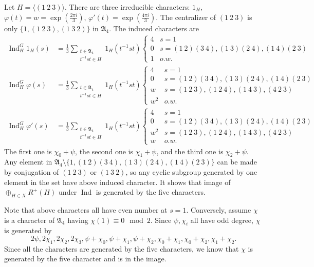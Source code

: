 \documentclass[a4paper, 12pt]{article}
\theoremstyle{Mydefinition}
\theoremstyle{Mytheorem}
\DeclareMathOperator{\Ind}{Ind}
\begin{document}
Let $H = \langle (1~2~3)\rangle$. There are three irreducible characters: $1_H$, $\varphi(t) = w= \exp\left(\frac{2\pi i}{3}\right)$, $\varphi'(t)=\exp\left(\frac{4\pi i}{3}\right)$. The centralizer of $(1~2~3)$ is only $\{1, (1~2~3), (1~3~2)\}$ in $\mathfrak{A}_4$. The induced characters are
\begin{equation}
\begin{split}
    \Ind_H^G 1_H(s) &=\frac{1}{3}\sum_{\substack{t\in \mathfrak{A}_4\\t^{-1}st\in H}} 1_H(t^{-1}st)\begin{cases}
    4 & s=1\\
    0 & s=(1~2)(3~4), (1~3)(2~4), (1~4)(2~3)\\
    1 & o.w.
    \end{cases}\\
    \Ind_H^G \varphi(s) &=\frac{1}{3}\sum_{\substack{t\in \mathfrak{A}_4\\t^{-1}st\in H}} 1_H(t^{-1}st)\begin{cases}
    4 & s=1\\
    0 & s=(1~2)(3~4), (1~3)(2~4), (1~4)(2~3)\\
    w & s=(1~2~3),(1~2~4),(1~4~3),(4~2~3)\\
    w^2 & o.w.
    \end{cases}\\
    \Ind_H^G \varphi'(s) &=\frac{1}{3}\sum_{\substack{t\in \mathfrak{A}_4\\t^{-1}st\in H}} 1_H(t^{-1}st)\begin{cases}
    4 & s=1\\
    0 & s=(1~2)(3~4), (1~3)(2~4), (1~4)(2~3)\\
    w^2 & s=(1~2~3),(1~2~4),(1~4~3),(4~2~3)\\
    w & o.w.
    \end{cases}
\end{split}
\end{equation}
The first one is $\chi_0+\psi$, the second one is $\chi_1+\psi$, and the third one is $\chi_2+\psi$. Any element in $\mathfrak{A}_4\setminus\{1, (1~2)(3~4), (1~3)(2~4), (1~4)(2~3)\}$ can be made by conjugation of $(1~2~3)$ or $(1~3~2)$, so any cyclic subgroup generated by one element in the set have above induced character. It shows that image of $\oplus_{H\in X}R^+(H)$ under $\Ind$ is generated by the five characters.

Note that above characters all have even number at $s=1$. Conversely, assume $\chi$ is a character of $\mathfrak{A}_4$ having $\chi(1)\equiv 0\mod 2$. Since $\psi,\chi_i$ all have odd degree, $\chi$ is generated by 
\begin{equation}
    2\psi, 2\chi_1,2\chi_2,2\chi_3,\psi+\chi_0,\psi+\chi_1, \psi+\chi_2,\chi_0+\chi_1,\chi_0+\chi_2,\chi_1+\chi_2.
\end{equation}
Since all the characters are generated by the five characters, we know that $\chi$ is generated by the five character and is in the image.
\end{document}
